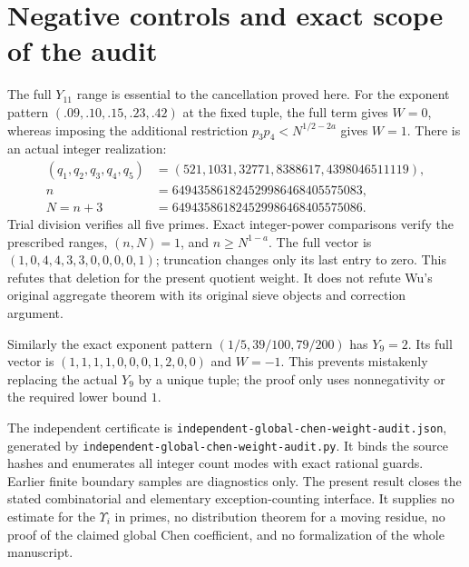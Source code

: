 \documentclass[11pt]{article}
\begin{document}
\section{Negative controls and exact scope of the audit}
The full $Y_{11}$ range is essential to the cancellation proved here.
For the exponent pattern $(.09,.10,.15,.23,.42)$ at the fixed tuple,
the full term gives $W=0$, whereas imposing the additional restriction
$p_3p_4<N^{1/2-2a}$ gives $W=1$. There is an actual integer realization:
\[
\begin{split}
(q_1,q_2,q_3,q_4,q_5)&=(521,1031,32771,8388617,4398046511119),\\
n&=649435861824529986468405575083,\\
N=n+3&=649435861824529986468405575086.
\end{split}
\]
Trial division verifies all five primes. Exact integer-power comparisons
verify the prescribed ranges, $(n,N)=1$, and $n\ge N^{1-a}$.
The full vector is $(1,0,4,4,3,3,0,0,0,0,1)$; truncation changes only
its last entry to zero. This refutes that deletion for the present
quotient weight. It does not refute Wu's original aggregate theorem
with its original sieve objects and correction argument.

Similarly the exact exponent pattern $(1/5,39/100,79/200)$ has $Y_9=2$.
Its full vector is $(1,1,1,1,0,0,0,1,2,0,0)$ and $W=-1$.
This prevents mistakenly replacing the actual $Y_9$ by a unique tuple;
the proof only uses nonnegativity or the required lower bound $1$.

The independent certificate is
\texttt{independent-global-chen-weight-audit.json}, generated by
\texttt{independent-global-chen-weight-audit.py}. It binds the source
hashes and enumerates all integer count modes with exact rational
guards. Earlier finite boundary samples are diagnostics only.
The present result closes the stated combinatorial and elementary
exception-counting interface. It supplies no estimate for the
$\Upsilon_i$ in primes, no distribution theorem for a moving residue,
no proof of the claimed global Chen coefficient, and no formalization
of the whole manuscript.
\end{document}
